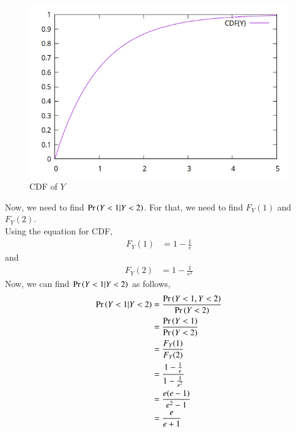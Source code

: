 \documentclass[journal,12pt, twocolumn]{IEEEtran}
\begin{document}
          \begin{figure}[h!]
              \centering
              \includegraphics[width=\columnwidth]{2023/ST/37/figs/cdf_plot.png}
              \caption{CDF of $Y$}
              \label{fig:st_37_2023_cdf_y}
          \end{figure}
          Now, we need to find $\Pr\left(Y<1 | Y<2 \right)$.
          For that, we need to find $F_Y(1)$ and $F_Y(2)$.\\
          Using the equation for CDF,
          \begin{align}
              F_Y(1) & = 1 - \frac{1}{e}
          \end{align}
          and
          \begin{align}
              F_Y(2) & = 1 - \frac{1}{e^2}
          \end{align}
          Now, we can find $\Pr\left(Y<1 | Y<2 \right)$ as follows,
          \begin{align}
              \Pr\left(Y<1 | Y<2 \right) & = \frac{\Pr\left(Y<1 , Y<2\right)}{\Pr\left(Y<2\right)}           \\
                              & = \frac{\Pr\left(Y<1\right)}{\Pr\left(Y<2\right)}                 \\
                              & = \frac{F_Y(1)}{F_Y(2)}                     \\
                              & = \frac{1 - \frac{1}{e}}{1 - \frac{1}{e^2}} \\
                              & = \frac{e(e-1)}{e^2-1}                      \\
                              & = \frac{e}{e+1}
          \end{align}
\end{document}

